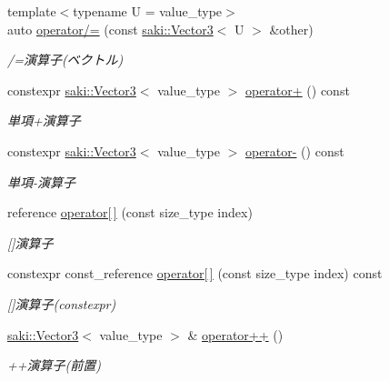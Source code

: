 \begin{DoxyCompactItemize}
{\footnotesize template$<$typename U  = value\+\_\+type$>$ }\\auto \mbox{\hyperlink{classsaki_1_1_vector3_a220b8c3bece7b7e09660748eae50aea0}{operator/=}} (const \mbox{\hyperlink{classsaki_1_1_vector3}{saki\+::\+Vector3}}$<$ U $>$ \&other)
\begin{DoxyCompactList}\small\item\em /=演算子(ベクトル) \end{DoxyCompactList}\item 
constexpr \mbox{\hyperlink{classsaki_1_1_vector3}{saki\+::\+Vector3}}$<$ value\+\_\+type $>$ \mbox{\hyperlink{classsaki_1_1_vector3_ac62c6c17a33ec907731ddf78cee93b0e}{operator+}} () const
\begin{DoxyCompactList}\small\item\em 単項+演算子 \end{DoxyCompactList}\item 
constexpr \mbox{\hyperlink{classsaki_1_1_vector3}{saki\+::\+Vector3}}$<$ value\+\_\+type $>$ \mbox{\hyperlink{classsaki_1_1_vector3_acba33249e560bb2a8d51c9af38c7f89b}{operator-\/}} () const
\begin{DoxyCompactList}\small\item\em 単項-\/演算子 \end{DoxyCompactList}\item 
reference \mbox{\hyperlink{classsaki_1_1_vector3_ac7f0fe0070c06ca0fd03b80225588fc8}{operator\mbox{[}$\,$\mbox{]}}} (const size\+\_\+type index)
\begin{DoxyCompactList}\small\item\em \mbox{[}\mbox{]}演算子 \end{DoxyCompactList}\item 
constexpr const\+\_\+reference \mbox{\hyperlink{classsaki_1_1_vector3_a600c14dfc11800251ed90b2346a70490}{operator\mbox{[}$\,$\mbox{]}}} (const size\+\_\+type index) const
\begin{DoxyCompactList}\small\item\em \mbox{[}\mbox{]}演算子(constexpr) \end{DoxyCompactList}\item 
\mbox{\hyperlink{classsaki_1_1_vector3}{saki\+::\+Vector3}}$<$ value\+\_\+type $>$ \& \mbox{\hyperlink{classsaki_1_1_vector3_a12d87bca02ff8707522914c7866a5e18}{operator++}} ()
\begin{DoxyCompactList}\small\item\em ++演算子(前置) \end{DoxyCompactList}\item 

\end{DoxyCompactItemize}
